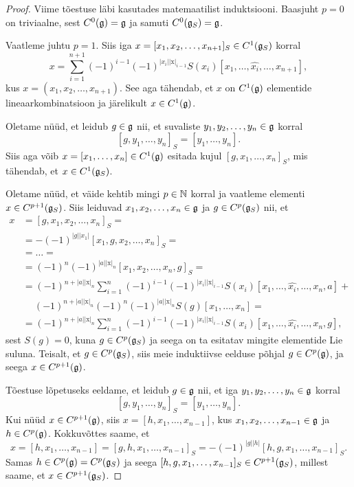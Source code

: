 \begin{proof}
    Viime tõestuse läbi kasutades matemaatilist induktsiooni.
    Baasjuht $p = 0$ on triviaalne, sest $C^0(\mathfrak{g}) = \mathfrak{g}$ ja
    samuti $C^0(\mathfrak{g}_S) = \mathfrak{g}$.

    Vaatleme juhtu $p = 1$. Siis iga
    $x = [x_1, x_2, \dots, x_{n+1}]_S \in C^1(\mathfrak{g}_S)$ korral
    \[
        x = \sum_{i=1}^{n+1} (-1)^{i-1}(-1)^{|x_i||\mathrm{x}|_{i-1}}
            S(x_i) [x_1, \dots, \hat{x_i}, \dots, x_{n+1}],
    \]
    kus $x = (x_1, x_2, \dots, x_{n+1})$. See aga tähendab, et
    $x$ on $C^1(\mathfrak{g})$ elementide lineaarkombinatsioon ja järelikult
    $x \in C^1(\mathfrak{g})$.

    Oletame nüüd, et leidub $g \in \mathfrak{g}$ nii, et suvaliste
    $y_1, y_2, \dots, y_n \in \mathfrak{g}$ korral
    \[
        [g, y_1, \dots, y_n]_S = [y_1, \dots, y_n].
    \]
    Siis aga võib $x = [x_1, \dots, x_n] \in C^1(\mathfrak{g})$
    esitada kujul $[g, x_1, \dots, x_n]_S$, mis tähendab, et
    $x \in C^1(\mathfrak{g}_S)$.

    Oletame nüüd, et väide kehtib mingi $p \in \mathbb{N}$ korral ja
    vaatleme elementi $x \in C^{p+1}(\mathfrak{g}_S)$. Siis leiduvad
    $x_1, x_2, \dots, x_n \in \mathfrak{g}$ ja $g \in C^p(\mathfrak{g}_S)$ nii, et
    \begin{align*}
        x &= [g, x_1, x_2, \dots, x_n]_S = \\
        &= -(-1)^{|g||x_1|} [x_1, g, x_2, \dots, x_n]_S = \\
        &= \dots = \\
        &= (-1)^n (-1)^{|a||\mathrm{x}|_n}
            [x_1, x_2, \dots, x_n, g]_S = \\
        &= (-1)^{n + |a||\mathrm{x}|_n}
            \sum_{i=1}^{n} (-1)^{i-1} (-1)^{|x_i||\mathrm{x}|_{i-1}}
                S(x_i) [x_1, \dots, \hat{x_i}, \dots, x_n, a] + \\
        &\quad\ (-1)^{n + |a||\mathrm{x}|_n}
            (-1)^n (-1)^{|a||\mathrm{x}|_n} S(g) [x_1, \dots, x_n] = \\
        &= (-1)^{n + |a||\mathrm{x}|_n} \sum_{i=1}^{n}
            (-1)^{i-1} (-1)^{|x_i||\mathrm{x}|_{i-1}}
            S(x_i) [x_1, \dots, \hat{x_i}, \dots, x_n, g],
    \end{align*}
    sest $S(g) = 0$, kuna $g \in C^p(\mathfrak{g}_S)$ ja seega on ta esitatav
    mingite elementide Lie suluna. Teisalt, et $g \in C^p(\mathfrak{g}_S)$,
    siis meie induktiivse eelduse põhjal $g \in C^p(\mathfrak{g})$, ja
    seega $x \in C^{p+1}(\mathfrak{g})$.

    Tõestuse lõpetuseks eeldame, et leidub $g \in \mathfrak{g}$ nii, et
    iga $y_1, y_2, \dots, y_n \in \mathfrak{g}$ korral
    \[
        [g, y_1, \dots, y_n]_S = [y_1, \dots, y_n].
    \]
    Kui nüüd $x \in C^{p+1}(\mathfrak{g})$, siis
    $x = [h, x_1, \dots, x_{n-1}]$, kus
    $x_1, x_2, \dots, x_{n-1} \in \mathfrak{g}$ ja $h \in C^p(\mathfrak{g})$.
    Kokkuvõttes saame, et
    \[
        x = [h, x_1, \dots, x_{n-1}] =
        [g, h, x_1, \dots, x_{n-1}]_S =
        -(-1)^{|g||h|} [h, g, x_1, \dots, x_{n-1}]_S.
    \]
    Samas $h \in C^p(\mathfrak{g}) = C^p(\mathfrak{g}_S)$ ja seega
    $[h, g, x_1, \dots, x_{n-1}]_S \in C^{p+1}(\mathfrak{g}_S)$, millest
    saame, et $x \in C^{p+1}(\mathfrak{g}_S)$.
\end{proof}
